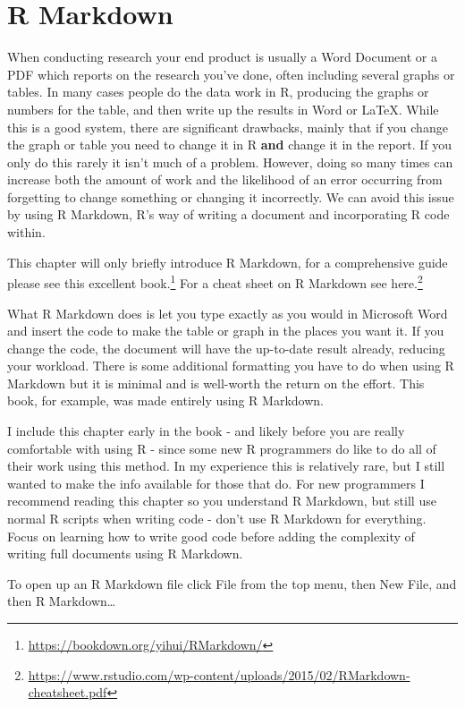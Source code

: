 \documentclass[
]{krantz}
\renewcommand{\href}[2]{#2\footnote{\url{#1}}}
\begin{document}
\hypertarget{r-markdown}{%
\chapter{R Markdown}\label{r-markdown}}

When conducting research your end product is usually a Word
Document or a PDF which reports on the research you've done,
often including several graphs or tables. In many cases
people do the data work in R, producing the graphs or
numbers for the table, and then write up the results in Word
or LaTeX. While this is a good system, there are significant
drawbacks, mainly that if you change the graph or table you
need to change it in R \textbf{and} change it in the report.
If you only do this rarely it isn't much of a problem.
However, doing so many times can increase both the amount of
work and the likelihood of an error occurring from
forgetting to change something or changing it incorrectly.
We can avoid this issue by using R Markdown, R's way of
writing a document and incorporating R code within.

This chapter will only briefly introduce R Markdown, for a
comprehensive guide please see
\href{https://bookdown.org/yihui/RMarkdown/}{this excellent
book.} For a cheat sheet on R Markdown see
\href{https://www.rstudio.com/wp-content/uploads/2015/02/RMarkdown-cheatsheet.pdf}{here.}

What R Markdown does is let you type exactly as you would in
Microsoft Word and insert the code to make the table or
graph in the places you want it. If you change the code, the
document will have the up-to-date result already, reducing
your workload. There is some additional formatting you have
to do when using R Markdown but it is minimal and is
well-worth the return on the effort. This book, for example,
was made entirely using R Markdown.

I include this chapter early in the book - and likely before
you are really comfortable with using R - since some new R
programmers do like to do all of their work using this
method. In my experience this is relatively rare, but I
still wanted to make the info available for those that do.
For new programmers I recommend reading this chapter so you
understand R Markdown, but still use normal R scripts when
writing code - don't use R Markdown for everything. Focus on
learning how to write good code before adding the complexity
of writing full documents using R Markdown.

To open up an R Markdown file click File from the top menu,
then New File, and then R Markdown\ldots{}
\end{document}
